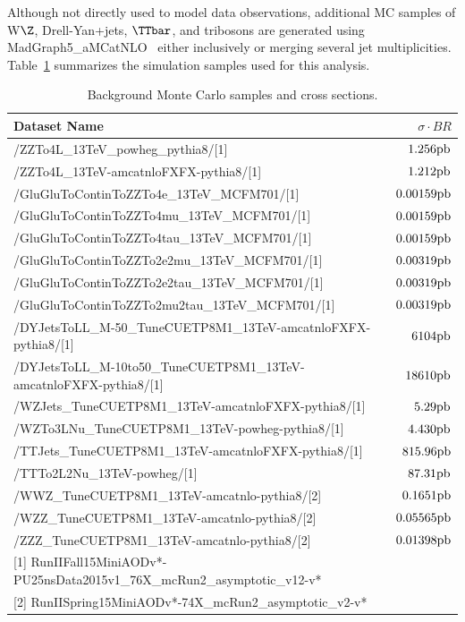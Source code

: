 Although not directly used to model data observations, additional
MC samples of W$\Z$, Drell-Yan+jets, $\TTbar$, and tribosons are
generated using {\sc MadGraph5\_aMCatNLO}~\cite{Alwall:2014hca} either
inclusively or merging several jet multiplicities.
Table~\ref{tab:MCsamples} summarizes the simulation samples used for this analysis.


 \begin{table}
\begin{footnotesize}
    \centering
    \begin{tabular}{|l|r|}
   \hline
  Dataset Name & $\sigma\cdot BR$ \\ \hline
  /ZZTo4L\_13TeV\_powheg\_pythia8/[1] & $1.256 \rm{pb}$ \\
  /ZZTo4L\_13TeV-amcatnloFXFX-pythia8/[1] & $1.212 \rm{pb}$ \\
  /GluGluToContinToZZTo4e\_13TeV\_MCFM701/[1] & $0.00159 \rm{ pb}$ \\
  /GluGluToContinToZZTo4mu\_13TeV\_MCFM701/[1] & $0.00159 \rm{ pb}$ \\
  /GluGluToContinToZZTo4tau\_13TeV\_MCFM701/[1] & $0.00159 \rm{ pb}$ \\
  /GluGluToContinToZZTo2e2mu\_13TeV\_MCFM701/[1] & $0.00319 \rm{ pb}$ \\
  /GluGluToContinToZZTo2e2tau\_13TeV\_MCFM701/[1] & $0.00319 \rm{ pb}$ \\
  /GluGluToContinToZZTo2mu2tau\_13TeV\_MCFM701/[1] & $0.00319 \rm{ pb}$ \\ \hline
  /DYJetsToLL\_M-50\_TuneCUETP8M1\_13TeV-amcatnloFXFX-pythia8/[1] & $6104 \rm{ pb}$ \\
  /DYJetsToLL\_M-10to50\_TuneCUETP8M1\_13TeV-amcatnloFXFX-pythia8/[1] & $18610 \rm{ pb}$ \\ \hline
  /WZJets\_TuneCUETP8M1\_13TeV-amcatnloFXFX-pythia8/[1] &  $5.29 \rm{pb}$ \\
  /WZTo3LNu\_TuneCUETP8M1\_13TeV-powheg-pythia8/[1] & $4.430 \rm{ pb}$ \\ \hline
  /TTJets\_TuneCUETP8M1\_13TeV-amcatnloFXFX-pythia8/[1] & $815.96 \rm{ pb}$ \\
  /TTTo2L2Nu\_13TeV-powheg/[1] &  $87.31 \rm{pb}$ \\ \hline
  /WWZ\_TuneCUETP8M1\_13TeV-amcatnlo-pythia8/[2] & $0.1651 \rm{ pb}$ \\
  /WZZ\_TuneCUETP8M1\_13TeV-amcatnlo-pythia8/[2] & $0.05565 \rm{ pb}$ \\
 /ZZZ\_TuneCUETP8M1\_13TeV-amcatnlo-pythia8/[2] & $0.01398 \rm{ pb}$ \\ \hline
 \multicolumn{3}{l}{[1] RunIIFall15MiniAODv*-PU25nsData2015v1\_76X\_mcRun2\_asymptotic\_v12-v*}\\
 \multicolumn{3}{l}{[2] RunIISpring15MiniAODv*-74X\_mcRun2\_asymptotic\_v2-v*}\\
 \end{tabular}
 \caption{Background Monte Carlo samples and cross sections.}
  \label{tab:MCsamples}
\end{footnotesize}
\end{table}
